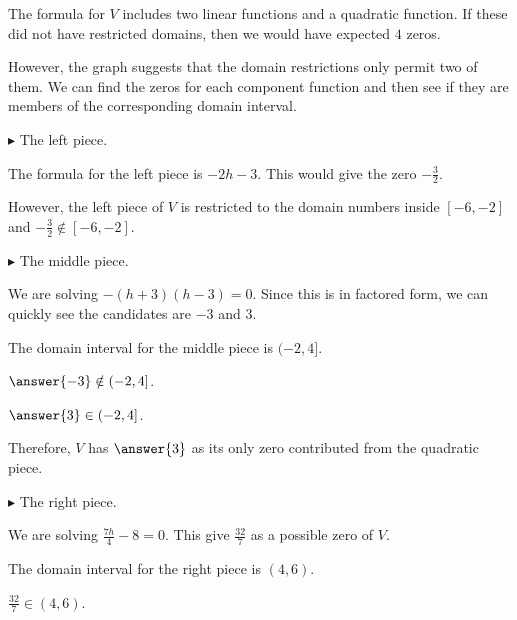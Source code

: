 \documentclass{ximera}
\begin{document}
The formula for $V$ includes two linear functions and a quadratic function.  If these did not have restricted domains, then we would have expected $4$ zeros.


However, the graph suggests that the domain restrictions only permit two of them.  We can find the zeros for each component function and then see if they are members of the corresponding domain interval. 




$\blacktriangleright$ The left piece. 

\begin{explanation}

The formula for the left piece is $-2h-3$.  This would give the zero $-\frac{3}{2}$. 

However, the left piece of $V$ is restricted to the domain numbers inside $[-6,-2]$ and $-\frac{3}{2} \notin [-6,-2]$.

\end{explanation}





$\blacktriangleright$ The middle piece. 


\begin{explanation}


We are solving $-(h+3)(h-3) = 0$.  Since this is in factored form, we can quickly see the candidates are $-3$ and $3$.   


The domain interval for the middle piece is $(-2,4]$. 


$\answer{-3} \notin (-2,4]$. 

$\answer{3} \in (-2,4]$. 


Therefore, $V$ has $\answer{3}$ as its only zero contributed from the quadratic piece.

\end{explanation}



$\blacktriangleright$ The right piece. 


\begin{explanation}


We are solving $\frac{7h}{4} - 8 = 0$.  This give $\frac{32}{7}$ as a possible zero of $V$. 


The domain interval for the right piece is $(4, 6)$. 

$\frac{32}{7} \in (4, 6)$. 


\end{explanation}
\end{document}
